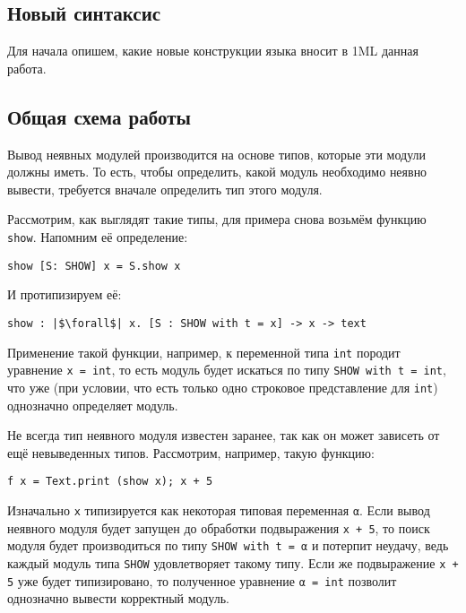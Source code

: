 \documentclass[../diploma.tex]{subfiles}
\begin{document}
\label{sec:1}

\subsection{Новый синтаксис}

Для начала опишем, какие новые конструкции языка вносит в 1ML данная работа. 

\subsection{Общая схема работы}

Вывод неявных модулей производится на основе типов, которые эти модули должны иметь. То есть, чтобы определить, какой модуль необходимо неявно вывести, требуется вначале определить тип этого модуля. 

Рассмотрим, как выглядят такие типы, для примера снова возьмём функцию \texttt{show}. Напомним её определение:

\begin{verbatim}
show [S: SHOW] x = S.show x
\end{verbatim}

И протипизируем её:

\begin{verbatim}
show : |$\forall$| x. [S : SHOW with t = x] -> x -> text
\end{verbatim}

Применение такой функции, например, к переменной типа \texttt{int} породит уравнение \texttt{x = int}, то есть модуль будет искаться по типу \texttt{SHOW with t = int}, что уже (при условии, что есть только одно строковое представление для \texttt{int}) однозначно определяет модуль.

Не всегда тип неявного модуля известен заранее, так как он может зависеть от ещё невыведенных типов. Рассмотрим, например, такую функцию:

\begin{verbatim}
f x = Text.print (show x); x + 5
\end{verbatim}

Изначально \texttt{x} типизируется как некоторая типовая переменная \texttt{α}. Если вывод неявного модуля будет запущен до обработки подвыражения \texttt{x + 5}, то поиск модуля будет производиться по типу \texttt{SHOW with t = α} и потерпит неудачу, ведь каждый модуль типа \texttt{SHOW} удовлетворяет такому типу. Если же подвыражение \texttt{x + 5} уже будет типизировано, то полученное уравнение \texttt{α = int} позволит однозначно вывести корректный модуль.
\end{document}
